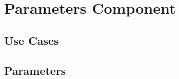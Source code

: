 
\section{Parameters Component} \label{s:component-parameters}

\subsection{Use Cases}
\subsection{Parameters}

